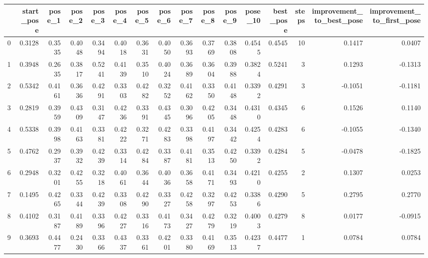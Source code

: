 \begin{tabular}{lrrrrrrrrrrrrrrr}
\toprule
{} &  start\_pose &  pose\_1 &  pose\_2 &  pose\_3 &  pose\_4 &  pose\_5 &  pose\_6 &  pose\_7 &  pose\_8 &  pose\_9 &  pose\_10 &  best\_pose &  steps &  improvement\_to\_best\_pose &  improvement\_to\_first\_pose \\
\midrule
0   &      0.3128 &  0.3535 &  0.4048 &  0.3494 &  0.4018 &  0.3631 &  0.4050 &  0.3693 &  0.3769 &  0.3808 &   0.4545 &     0.4545 &     10 &                    0.1417 &                     0.0407 \\
1   &      0.3948 &  0.2635 &  0.3817 &  0.5241 &  0.4139 &  0.3510 &  0.4024 &  0.3689 &  0.3604 &  0.3988 &   0.3824 &     0.5241 &      3 &                    0.1293 &                    -0.1313 \\
2   &      0.5342 &  0.4161 &  0.3636 &  0.4291 &  0.3303 &  0.4282 &  0.3252 &  0.4162 &  0.3350 &  0.4148 &   0.3392 &     0.4291 &      3 &                   -0.1051 &                    -0.1181 \\
3   &      0.2819 &  0.3959 &  0.4309 &  0.3147 &  0.4236 &  0.3391 &  0.4345 &  0.3096 &  0.4205 &  0.3448 &   0.4310 &     0.4345 &      6 &                    0.1526 &                     0.1140 \\
4   &      0.5338 &  0.3998 &  0.4163 &  0.3381 &  0.4222 &  0.3271 &  0.4283 &  0.3398 &  0.4197 &  0.3442 &   0.4254 &     0.4283 &      6 &                   -0.1055 &                    -0.1340 \\
5   &      0.4762 &  0.2937 &  0.3932 &  0.4239 &  0.3314 &  0.4284 &  0.3387 &  0.4181 &  0.3513 &  0.4250 &   0.3392 &     0.4284 &      5 &                   -0.0478 &                    -0.1825 \\
6   &      0.2948 &  0.3201 &  0.4255 &  0.3218 &  0.4061 &  0.3644 &  0.4036 &  0.3658 &  0.4171 &  0.3493 &   0.4210 &     0.4255 &      2 &                    0.1307 &                     0.0253 \\
7   &      0.1495 &  0.4265 &  0.3344 &  0.4239 &  0.3308 &  0.4290 &  0.3327 &  0.4258 &  0.3297 &  0.4253 &   0.3386 &     0.4290 &      5 &                    0.2795 &                     0.2770 \\
8   &      0.4102 &  0.3187 &  0.4189 &  0.3396 &  0.4227 &  0.3316 &  0.4173 &  0.3427 &  0.4279 &  0.3219 &   0.4003 &     0.4279 &      8 &                    0.0177 &                    -0.0915 \\
9   &      0.3693 &  0.4477 &  0.2430 &  0.3366 &  0.4337 &  0.3361 &  0.4201 &  0.3380 &  0.4169 &  0.3513 &   0.4237 &     0.4477 &      1 &                    0.0784 &                     0.0784 \\

\end{tabular}
